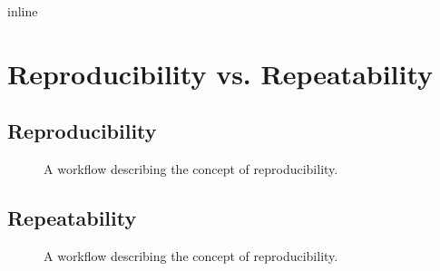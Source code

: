 \documentclass[letterpaper,10pt,english]{sphinxmanual}
\begin{document}
\begin{sphinxVerbatim}[commandchars=\\\{\}]
 inline
   
   
   
    

       
         
\end{sphinxVerbatim}


\section{Reproducibility vs. Repeatability}
\label{\detokenize{01-Introduction:reproducibility-vs-repeatability}}

\subsection{Reproducibility}
\label{\detokenize{01-Introduction:reproducibility}}
\begin{figure}[htbp]
\centering
\capstart

\noindent{}
\caption{A workflow describing the concept of reproducibility.}\label{\detokenize{01-Introduction:id18}}\end{figure}




\subsection{Repeatability}
\label{\detokenize{01-Introduction:repeatability}}
\begin{figure}[htbp]
\centering
\capstart

\noindent{}
\caption{A workflow describing the concept of reproducibility.}\label{\detokenize{01-Introduction:id19}}\end{figure}
\end{document}
